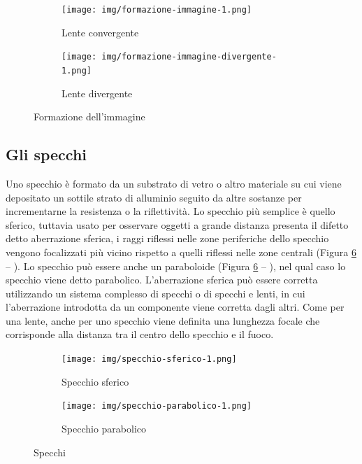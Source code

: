 \begin{figure}
\begin{subfigure}[b]{.5\textwidth}
\centering
\texttt{[image: img/formazione-immagine-1.png]}
\caption{Lente convergente}\label{fig:formazione-lente-convergente}
\end{subfigure}
\begin{subfigure}[b]{.5\textwidth}
\centering
\texttt{[image: img/formazione-immagine-divergente-1.png]}
\caption{Lente divergente}\label{fig:formazione-lente-divergente}
\end{subfigure}
\caption{Formazione dell'immagine}
\label{fig:formazione-immagine}
\end{figure}

\subsection{Gli specchi}

Uno specchio è formato da un substrato di vetro o altro materiale su cui viene depositato un sottile
strato di alluminio seguito da altre sostanze per incrementarne la resistenza o la riflettività. Lo
specchio più semplice è quello sferico, tuttavia  usato per osservare oggetti a
grande distanza presenta il difetto detto aberrazione sferica,  i raggi riflessi nelle zone
periferiche dello specchio vengono focalizzati più vicino rispetto a quelli riflessi nelle zone centrali
(Figura \ref{fig:specchi} -- ).
Lo specchio può essere anche un paraboloide (Figura \ref{fig:specchi} -- ), nel qual caso lo specchio viene detto parabolico. 
L'aberrazione sferica può essere corretta utilizzando un sistema  complesso di specchi o di specchi e lenti, in cui l'aberrazione introdotta da un componente viene corretta dagli altri.
Come per una lente, anche per uno specchio viene definita una lunghezza focale che corrisponde
alla distanza tra il centro dello specchio e il fuoco.

\begin{figure}
\begin{subfigure}[b]{.5\textwidth}
\centering
\texttt{[image: img/specchio-sferico-1.png]}
\caption{Specchio sferico}\label{fig:specchio-sferico}
\end{subfigure}
\begin{subfigure}[b]{.5\textwidth}
\centering
\texttt{[image: img/specchio-parabolico-1.png]}
\caption{Specchio parabolico}\label{fig:specchio-parabolico}
\end{subfigure}
\caption{Specchi}
\label{fig:specchi}
\end{figure}


